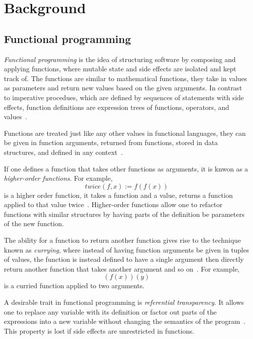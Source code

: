 \chapter{Background}\label{ch:background}

\section{Functional programming}\label{sec:functional}

\emph{Functional programming} is the idea of structuring software by composing
and applying functions, where mutable state and side effects are isolated and
kept track of. The functions are similar to mathematical functions, they take in
values as parameters and return new values based on the given arguments. In
contrast to imperative procedues, which are defined by sequences of statements
with side effects, function definitions are expression trees of functions,
operators, and values~\cite{functional-Hudak, functional-Hughes}.

Functions are treated just like any other values in functional languages, they
can be given in function arguments, returned from functions, stored in data
structures, and defined in any context~\cite{functional-Hudak, sicp}.

If one defines a function that takes other functions as arguments, it is knwon
as a \emph{higher-order functions}. For example,
\begin{equation}
  \mathit{twice}(f, x) := f(f(x))
  \label{eq:higher-order-ex}
\end{equation}
is a higher order function, it takes a function and a value, returns a function
applied to that value twice~\cite{functional-Hudak}. Higher-order functions
allow one to refactor functions with similar structures by having parts of the
definition be parameters of the new function.

The ability for a function to return another function gives rise to the
technique known as \emph{currying}, where instead of having function arguments
be given in tuples of values, the function is instead defined to have a single
argument then directly return another function that takes another argument and
so on~\cite{functional-Hudak, functional-Barendregt, combinator-Curry}. For
example,
\begin{equation}
  (f(x))(y)
  \label{eq:curry-ex}
\end{equation}
is a curried function applied to two arguments.

A desirable trait in functional programming is \emph{referential transparency}.
It allows one to replace any variable with its definition or factor out parts of
the expressions into a new variable without changing the semantics of the
program~\cite{functional-Hudak, functional-Hughes, functional-Barendregt}. This
property is lost if side effects are unrestricted in functions.

